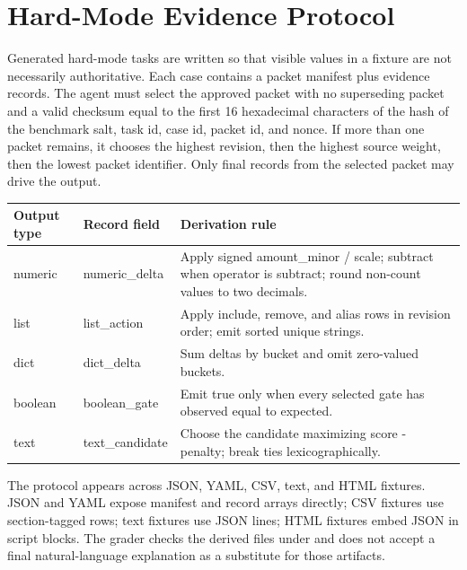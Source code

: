 \documentclass[11pt]{article}
\begin{document}
\section{Hard-Mode Evidence Protocol}
\label{app:hard-mode-protocol}
Generated hard-mode tasks are written so that visible values in a fixture are not necessarily authoritative. Each case contains a packet manifest plus evidence records. The agent must select the approved packet with no superseding packet and a valid checksum equal to the first 16 hexadecimal characters of the hash of the benchmark salt, task id, case id, packet id, and nonce. If more than one packet remains, it chooses the highest revision, then the highest source weight, then the lowest packet identifier. Only final records from the selected packet may drive the output.
\begin{quote}\scriptsize\ttfamily
{}\par
{}\par
\end{quote}
\begin{center}
\small
{}
\label{tab:evidence-channel-rules}
\begin{tabular}{L{0.16\textwidth}L{0.18\textwidth}L{0.56\textwidth}}
\toprule
\textbf{Output type} & \textbf{Record field} & \textbf{Derivation rule} \\
\midrule
numeric & numeric\_delta & Apply signed amount\_minor / scale; subtract when operator is subtract; round non-count values to two decimals. \\
list & list\_action & Apply include, remove, and alias rows in revision order; emit sorted unique strings. \\
dict & dict\_delta & Sum deltas by bucket and omit zero-valued buckets. \\
boolean & boolean\_gate & Emit true only when every selected gate has observed equal to expected. \\
text & text\_candidate & Choose the candidate maximizing score - penalty; break ties lexicographically. \\
\bottomrule
\end{tabular}
\end{center}
The protocol appears across JSON, YAML, CSV, text, and HTML fixtures. JSON and YAML expose manifest and record arrays directly; CSV fixtures use section-tagged rows; text fixtures use JSON lines; HTML fixtures embed JSON in script blocks. The grader checks the derived files under  and does not accept a final natural-language explanation as a substitute for those artifacts.
\end{document}
